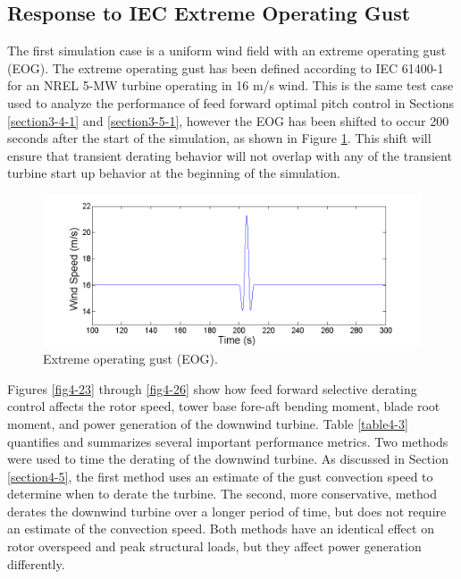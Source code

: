 \subsection{Response to IEC Extreme Operating Gust} \label{section4-6-1}

The first simulation case is a uniform wind field with an extreme operating gust (EOG). The extreme operating gust has been defined according to IEC 61400-1 \cite{IEC2005} for an NREL 5-MW turbine operating in 16 m/s wind. This is the same test case used to analyze the performance of feed forward optimal pitch control in Sections \ref{section3-4-1} and \ref{section3-5-1}, however the EOG has been shifted to occur 200 seconds after the start of the simulation, as shown in Figure \ref{fig4-22}. This shift will ensure that transient derating behavior will not overlap with any of the transient turbine start up  behavior at the beginning of the simulation.

\begin{figure}[htb]
	\centering
		\includegraphics[width = \linewidth]{Figures/ch4Figures/fig4-22.png}
		
	\caption{Extreme operating gust (EOG).}
	\label{fig4-22}
\end{figure}

Figures \ref{fig4-23} through \ref{fig4-26} show how feed forward selective derating control affects the rotor speed, tower base fore-aft bending moment, blade root moment, and power generation of the downwind turbine. Table \ref{table4-3} quantifies and summarizes several important performance metrics. Two methods were used to time the derating of the downwind turbine. As discussed in Section \ref{section4-5}, the first method uses an estimate of the gust convection speed to determine when to derate the turbine. The second, more conservative,  method derates the downwind turbine over a longer period of time, but does not require an estimate of the convection speed. Both methods have an identical effect on rotor overspeed and peak structural loads, but they affect power generation differently. 

